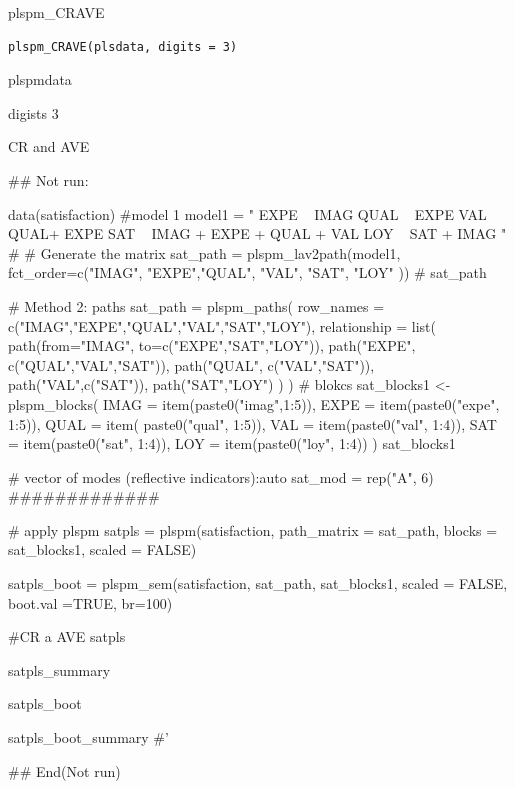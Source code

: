\documentclass[a4paper]{book}
\begin{document}
%
\begin{Description}
plspm\_CRAVE
\end{Description}
%
\begin{Usage}
\begin{verbatim}
plspm_CRAVE(plsdata, digits = 3)
\end{verbatim}
\end{Usage}
%
\begin{Arguments}
\begin{ldescription}
\item[\code{plsdata}] plspmdata

\item[\code{digits}] digists 3
\end{ldescription}
\end{Arguments}
%
\begin{Value}
CR and AVE
\end{Value}
%
\begin{Examples}
\begin{ExampleCode}

\#\# Not run: 

data(satisfaction)
#model 1
model1 = "
EXPE ~ IMAG
QUAL ~ EXPE
VAL ~  QUAL+ EXPE
SAT ~ IMAG + EXPE + QUAL + VAL
LOY ~ SAT + IMAG
"
# # Generate the matrix
sat_path = plspm_lav2path(model1,
                          fct_order=c("IMAG", "EXPE","QUAL", "VAL", "SAT", "LOY" ))
# sat_path

# Method 2: paths
sat_path = plspm_paths(
  row_names = c("IMAG","EXPE","QUAL","VAL","SAT","LOY"),
  relationship = list(
    path(from="IMAG", to=c("EXPE","SAT","LOY")),
    path("EXPE", c("QUAL","VAL","SAT")),
    path("QUAL", c("VAL","SAT")),
    path("VAL",c("SAT")),
    path("SAT","LOY")
  )
)
# blokcs
sat_blocks1 <- plspm_blocks(
  IMAG = item(paste0("imag",1:5)),
  EXPE = item(paste0("expe", 1:5)),
  QUAL = item( paste0("qual", 1:5)),
  VAL = item(paste0("val", 1:4)),
  SAT = item(paste0("sat", 1:4)),
  LOY = item(paste0("loy", 1:4))
)
sat_blocks1

# vector of modes (reflective indicators):auto
sat_mod = rep("A", 6)
#############

# apply plspm
satpls = plspm(satisfaction,
                   path_matrix = sat_path,
                   blocks = sat_blocks1,
                   scaled = FALSE)

satpls_boot = plspm_sem(satisfaction, sat_path, sat_blocks1, scaled = FALSE,
                        boot.val =TRUE, br=100)

#CR a AVE
satpls%

satpls_summary%

satpls_boot%

satpls_boot_summary%
#'

## End(Not run)



\end{ExampleCode}
\end{Examples}
\end{document}
